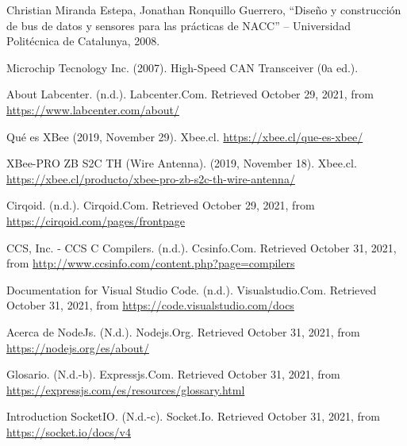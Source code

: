 \begin{thebibliography}{99}
 Christian Miranda Estepa, Jonathan Ronquillo Guerrero, “Diseño y construcción de bus de datos y sensores para las prácticas de NACC” – Universidad Politécnica de Catalunya, 2008.

 Microchip Tecnology Inc. (2007). High-Speed CAN Transceiver (0a ed.).

 About Labcenter. (n.d.). Labcenter.Com. Retrieved October 29, 2021, from \url{https://www.labcenter.com/about/}



 Qué es XBee (2019, November 29). Xbee.cl. \url{https://xbee.cl/que-es-xbee/} 

 XBee-PRO ZB S2C TH (Wire Antenna). (2019, November 18). Xbee.cl. \url{ https://xbee.cl/producto/xbee-pro-zb-s2c-th-wire-antenna/}

 Cirqoid. (n.d.). Cirqoid.Com. Retrieved October 29, 2021, from \url{https://cirqoid.com/pages/frontpage}



  CCS, Inc. - CCS C Compilers. (n.d.). Ccsinfo.Com. Retrieved October 31, 2021, from \url{http://www.ccsinfo.com/content.php?page=compilers}


  Documentation for Visual Studio Code. (n.d.). Visualstudio.Com. Retrieved October 31, 2021, from \url{https://code.visualstudio.com/docs}
 
  Acerca de NodeJs. (N.d.). Nodejs.Org. Retrieved October 31, 2021, from \url{https://nodejs.org/es/about/}
 
  Glosario. (N.d.-b). Expressjs.Com. Retrieved October 31, 2021, from \url{https://expressjs.com/es/resources/glossary.html}
 
  Introduction SocketIO. (N.d.-c). Socket.Io. Retrieved October 31, 2021, from \url{https://socket.io/docs/v4}




\end{thebibliography}
